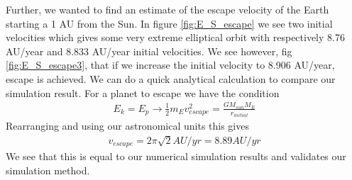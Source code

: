 \documentclass[a4paper,11pt]{article}
\begin{document}
{Further, we wanted to find an estimate of the escape velocity of the Earth starting a 1 AU from the Sun. In figure \ref{fig:E_S_escape} we see two initial velocities which gives some very extreme elliptical orbit with respectively 8.76 AU/year and 8.833 AU/year initial velocities. We see however, fig \ref{fig:E_S_escape3}, that if we increase the initial velocity to 8.906 AU/year, escape is achieved. We can do a quick analytical calculation to compare our simulation result. For a planet to escape we have the condition
\begin{align}
	E_k = E_p \to \frac{1}{2}m_E v_{escape}^2 = \frac{GM_{sun}M_E }{r_{initial}}
\end{align}
Rearranging and using our astronomical units this gives
\begin{align}
	v_{escape} = 2\pi \sqrt{2} AU/yr = 8.89 AU/yr
\end{align}
We see that this is equal to our numerical simulation results and validates our simulation method. 

}
\end{document}
